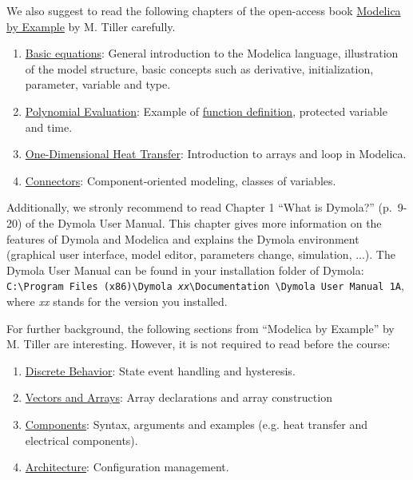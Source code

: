 \documentclass[10pt,a4paper]{article}
\begin{document}
We also suggest to read the following chapters of the open-access book \href{https://mbe.modelica.university/}{Modelica by Example} by M. Tiller carefully.

\begin{enumerate}
\item \href{https://mbe.modelica.university/behavior/equations/}{Basic equations}: General introduction to the Modelica language, illustration of the model structure, basic concepts such as derivative, initialization, parameter, variable and type.
\item \href{https://mbe.modelica.university/behavior/functions/polynomial/}{Polynomial 
Evaluation}: Example of \href{https://mbe.modelica.university/behavior/functions/func_def/}{function definition}, protected variable and time.
\item \href{https://mbe.modelica.university/behavior/arrays/oned/}{One-Dimensional Heat Transfer}: Introduction to arrays and loop in Modelica.
\item \href{https://mbe.modelica.university/components/connectors/}{Connectors}: Component-oriented modeling, classes of variables.
\end{enumerate}

Additionally, we stronly recommend to read Chapter 1 ``What is Dymola?'' (p.~9-20) of the Dymola User Manual. This chapter gives more information on the features of Dymola and Modelica and explains the Dymola environment (graphical user interface, model editor, parameters change, simulation, ...). The Dymola User Manual can be found in your installation folder of Dymola: \texttt{C:\textbackslash Program 
Files (x86)\textbackslash Dymola \textit{xx}\textbackslash Documentation 
\textbackslash Dymola User Manual 1A}, where \textit{xx} stands for the 
version you installed. 

For further background, the following sections from ``Modelica by Example'' by 
M. Tiller are interesting. However, it is not required to read before the 
course: 

\begin{enumerate}
\item \href{https://mbe.modelica.university/behavior/discrete/}{Discrete Behavior}: State event handling and hysteresis.
\item \href{https://mbe.modelica.university/behavior/arrays/}{Vectors and Arrays}: Array declarations and array construction
\item \href{https://mbe.modelica.university/components/components/}{Components}: Syntax, arguments and examples (e.g. heat transfer and electrical components).
\item \href{https://mbe.modelica.university/components/architectures/}{Architecture}: Configuration management.
\end{enumerate}
\end{document}
